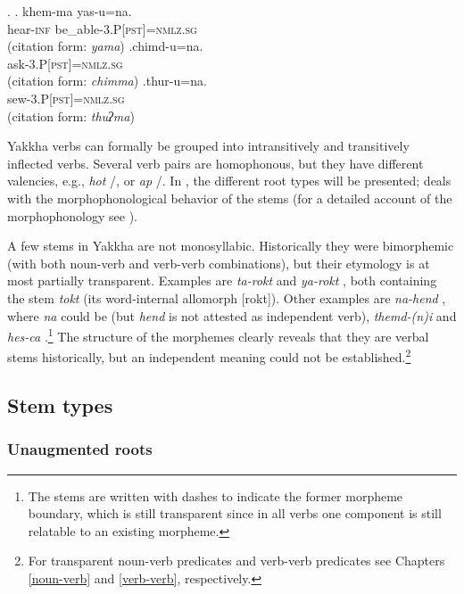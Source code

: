 \ex. \ag. khem-ma yas-u=na.\\
 hear{\scshape -inf} be\_able{\scshape -3.P[pst]=nmlz.sg}\\
 (citation form: \emph{yama})
\bg.chimd-u=na.\\
ask{\scshape -3.P[pst]=nmlz.sg}\\
 (citation form: \emph{chimma})
\bg.thur-u=na.\\
sew{\scshape -3.P[pst]=nmlz.sg}\\
 (citation form: \emph{thuʔma})


Yakkha verbs can  formally  be grouped into intransitively and transitively inflected verbs. Several verb pairs are homophonous, but they have different valencies, e.g., \emph{hot} /, or \emph{ap}   /. In , the different root types will be presented;  deals with the morphophonological behavior of the stems (for a detailed account of the morphophonology see ).

A few stems in Yakkha are not monosyllabic. Historically they were bimorphemic (with both noun-verb and verb-verb combinations), but their etymology is at most partially transparent. Examples are \emph{ta-rokt}  and \emph{ya-rokt} , both containing the stem \emph{tokt}  (its word-internal allomorph [rokt]). Other examples are  \emph{na-hend} , where \emph{na} could be  (but \emph{hend} is not attested as independent verb), \emph{themd-(n)i}  and \emph{hes-ca} .\footnote{The stems are written with dashes to indicate the former morpheme boundary, which is still transparent since in all verbs one component is still relatable to an existing  morpheme.} The structure of the morphemes clearly reveals that they are verbal stems historically, but an independent  meaning could not be established.\footnote{For transparent noun-verb predicates and verb-verb predicates see Chapters \ref{noun-verb} and \ref{verb-verb}, respectively.}

\subsection{Stem types}\label{stem-1}
\subsubsection{Unaugmented roots}\label{unaugmented}

